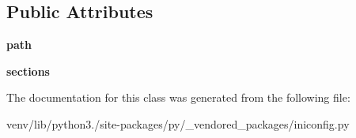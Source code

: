 \subsection*{Public Attributes}
\begin{DoxyCompactItemize}
\item 
\mbox{\label{classpy_1_1__vendored__packages_1_1iniconfig_1_1_ini_config_aa15b84f4bcb5e14814cc54c8d8436a4f}} 
{\bfseries path}
\item 
\mbox{\label{classpy_1_1__vendored__packages_1_1iniconfig_1_1_ini_config_ad575973bca8f0e8819cafb92738d9a2d}} 
{\bfseries sections}
\end{DoxyCompactItemize}


The documentation for this class was generated from the following file\+:\begin{DoxyCompactItemize}
\item 
venv/lib/python3./site-\/packages/py/\+\_\+vendored\+\_\+packages/iniconfig.\+py\end{DoxyCompactItemize}
